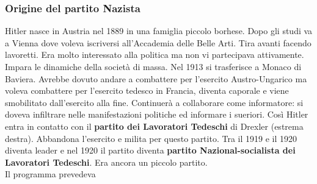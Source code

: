 \subsubsection{Origine del partito Nazista}
Hitler nasce in Austria nel 1889 in una famiglia piccolo borhese. Dopo gli studi va a Vienna dove
voleva iscriversi all'Accademia delle Belle Arti. Tira avanti facendo lavoretti. Era molto 
interessato alla politica ma non vi partecipava attivamente. Impara le dinamiche della società di
massa. Nel 1913 si trasferisce a Monaco di Baviera. Avrebbe dovuto andare a combattere per l'esercito
Austro-Ungarico ma voleva combattere per l'esercito tedesco in Francia, diventa caporale e viene
smobilitato dall'esercito alla fine. Continuerà a collaborare come informatore: si doveva infiltrare
nelle manifestazioni politiche ed informare i sueriori. Così Hitler entra in contatto con il
\textbf{partito dei Lavoratori Tedeschi} di Drexler (estrema destra). Abbandona l'esercito e milita
per questo partito. Tra il 1919 e il 1920 diventa leader e nel 1920 il partito diventa 
\textbf{partito Nazional-socialista dei Lavoratori Tedeschi}. Era ancora un piccolo partito.\\
[\baselineskip]
Il programma prevedeva
